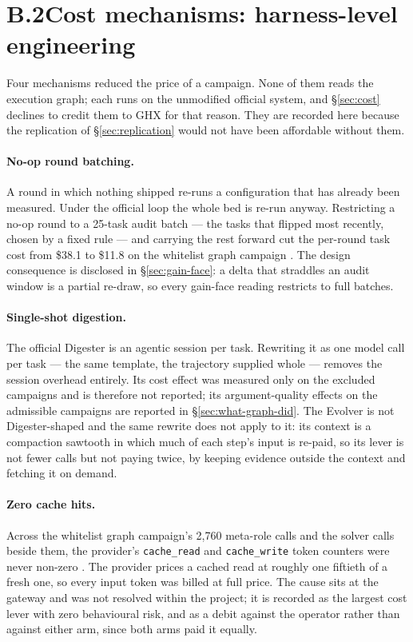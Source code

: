 \section*{B.2\quad Cost mechanisms: harness-level engineering}
\label{app:cost}

Four mechanisms reduced the price of a campaign. None of them reads the
execution graph; each runs on the unmodified official system, and
\S\ref{sec:cost} declines to credit them to GHX for that reason. They are
recorded here because the replication of \S\ref{sec:replication} would not
have been affordable without them.

\paragraph{No-op round batching.} A round in which nothing shipped re-runs
a configuration that has already been measured. Under the official loop
the whole bed is re-run anyway. Restricting a no-op round to a 25-task
audit batch --- the tasks that flipped most recently, chosen by a fixed
rule --- and carrying the rest forward cut the per-round task cost from
\$38.1 to \$11.8 on the whitelist graph campaign . The design
consequence is disclosed in \S\ref{sec:gain-face}: a delta that straddles
an audit window is a partial re-draw, so every gain-face reading restricts
to full batches.

\paragraph{Single-shot digestion.} The official Digester is an agentic
session per task. Rewriting it as one model call per task --- the same
template, the trajectory supplied whole --- removes the session overhead
entirely. Its cost effect was measured only on the excluded campaigns and
is therefore not reported; its argument-quality effects on the admissible
campaigns are reported in \S\ref{sec:what-graph-did}. The Evolver is not
Digester-shaped and the same rewrite does not apply to it: its context is
a compaction sawtooth in which much of each step's input is re-paid, so
its lever is not fewer calls but not paying twice, by keeping evidence
outside the context and fetching it on demand.

\paragraph{Zero cache hits.} Across the whitelist graph campaign's 2{,}760
meta-role calls and the solver calls beside them, the provider's
\texttt{cache\_read} and \texttt{cache\_write} token counters were never
non-zero . The provider prices a cached read at roughly one fiftieth
of a fresh one, so every input token was billed at full price. The cause
sits at the gateway and was not resolved within the project; it is
recorded as the largest cost lever with zero behavioural risk, and as a
debit against the operator rather than against either arm, since both
arms paid it equally.

